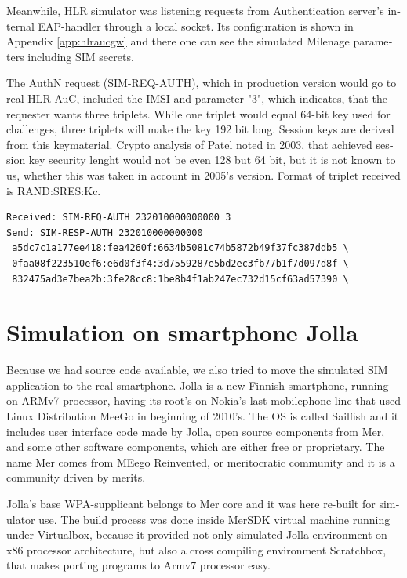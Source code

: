 \documentclass[12pt,a4paper,english]{tutthesis}
\begin{document}
\begin{otherlanguage}{english}
Meanwhile, HLR simulator was listening requests from Authentication
server's internal EAP-handler through a local socket. 
Its configuration is shown in
Appendix \ref{app:hlraucgw} and there one can see the simulated Milenage parameters including SIM secrets.



The AuthN request (SIM-REQ-AUTH), which in production version would go
to real HLR-AuC, included the IMSI and parameter "3", which indicates,
that the requester wants three triplets.  
While one triplet would equal 64-bit key used for challenges, three
triplets will make the key 192 bit long. Session keys are derived from
this keymaterial. Crypto analysis of Patel \cite{patel-sim} noted in
2003, that achieved session key security lenght would not be even 128
but 64 bit, but it is not known to us, whether this was taken in
account in 2005's version. 
Format of triplet received is RAND:SRES:Kc.

\footnotesize
\begin{verbatim}
Received: SIM-REQ-AUTH 232010000000000 3
Send: SIM-RESP-AUTH 232010000000000 
 a5dc7c1a177ee418:fea4260f:6634b5081c74b5872b49f37fc387ddb5 \
 0faa08f223510ef6:e6d0f3f4:3d7559287e5bd2ec3fb77b1f7d097d8f \
 832475ad3e7bea2b:3fe28cc8:1be8b4f1ab247ec732d15cf63ad57390 \
\end{verbatim}
\normalsize


\section{Simulation on smartphone Jolla}
\label{sec-5-3}

Because we had source code available, we also tried to move the
simulated SIM application to the real smartphone.  Jolla is a new
Finnish smartphone, running on ARMv7 processor, having its root's on
Nokia's last mobilephone line that used Linux Distribution MeeGo in
beginning of 2010's.  The OS is called Sailfish and it includes user
interface code made by Jolla, open source components from Mer, and
some other software components, which are either free or proprietary.
The name Mer comes from MEego Reinvented, or meritocratic community
and it is a community driven by merits.

Jolla's base
WPA-supplicant belongs to Mer core and it was here re-built for
simulator use. The build process was done inside MerSDK virtual
machine running under Virtualbox, because it provided not only
simulated Jolla environment on x86 processor architecture, but also a cross
compiling environment Scratchbox, that makes porting programs to Armv7
processor easy.


\end{otherlanguage}
\end{document}
